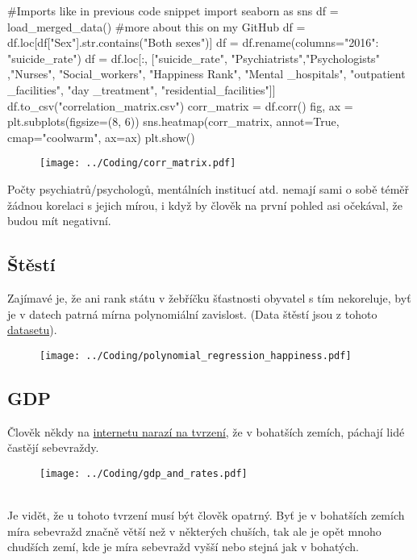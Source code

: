 \documentclass[12pt]{article}
\begin{document}
\begin{python}
#Imports like in previous code snippet
import seaborn as sns
df = load_merged_data() #more about this on my GitHub
df = df.loc[df["Sex"].str.contains("Both sexes")]
df = df.rename(columns={"2016": "suicide_rate"})
df = df.loc[:, ["suicide_rate", "Psychiatrists","Psychologists" ,"Nurses", "Social_workers", "Happiness Rank", "Mental _hospitals", "outpatient _facilities", "day _treatment", "residential_facilities"]]
df.to_csv("correlation_matrix.csv")
corr_matrix = df.corr()
fig, ax = plt.subplots(figsize=(8, 6))
sns.heatmap(corr_matrix, annot=True, cmap="coolwarm", ax=ax)
plt.show()
\end{python}
\newpage
\begin{figure}[hbt]
  \centering
  \texttt{[image: ../Coding/corr\_matrix.pdf]}
  \label{fig:plot}
\end{figure}

Počty psychiatrů/psychologů, mentálních institucí atd. nemají sami o sobě téměř žádnou korelaci s jejich mírou, i když by člověk na první pohled asi očekával, že budou mít negativní. 
\subsection{Štěstí}
Zajímavé je, že ani rank státu v žebříčku šťastnosti obyvatel s tím nekoreluje, byť je v datech patrná mírna polynomiální zavislost. (Data štěstí jsou z tohoto \href{https://www.kaggle.com/datasets/unsdsn/world-happiness}{datasetu}). 

\begin{figure}[hbt]
  \centering
  \texttt{[image: ../Coding/polynomial\_regression\_happiness.pdf]}
  \label{fig:plot}
\end{figure}

\subsection{GDP} Člověk někdy na \href{https://www.youtube.com/watch?v=brEU5j4IsxU}{internetu narazí na tvrzení}, že v bohatších zemích, páchají lidé častějí sebevraždy.
\begin{figure}[hbt]
  \centering
  \texttt{[image: ../Coding/gdp\_and\_rates.pdf]}
  \label{fig:plot}
\end{figure} \\
Je vidět, že u tohoto tvrzení musí být člověk opatrný. Byť je v bohatších zemích míra sebevražd značně větší než v některých chuších, tak ale je opět mnoho chudších zemí, kde je míra sebevražd vyšší nebo stejná jak v bohatých.


\renewcommand\refname{Reference}


\end{document}
